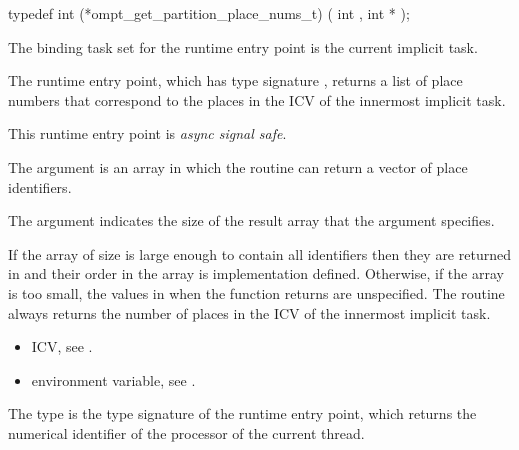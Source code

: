 \format
\begin{ccppspecific}
\begin{omptInquiry}
typedef int (*ompt_get_partition_place_nums_t) (
  int ,
  int *
);
\end{omptInquiry}
\end{ccppspecific}

\binding
The binding task set for the  runtime 
entry point is the current implicit task.

\descr
The  runtime entry point, which has
type signature , returns a list of 
place numbers that correspond to the places in the 
ICV of the innermost implicit task.

This runtime entry point is \emph{async signal safe}.

\argdesc
The  argument is an array in which the routine can 
return a vector of place identifiers.

The  argument indicates the size of the result
array that the  argument specifies.

\effect
If the  array of size  is large 
enough to contain all identifiers then they are returned in  
and their order in the array is implementation defined. Otherwise, if the 
 array is too small, the values in  when 
the function returns are unspecified. The routine always returns the number 
of places in the  ICV of the innermost implicit task.

\crossreferences
\begin{itemize}
\item {} ICV, see
.

\item {} environment variable, see
.
\end{itemize}



\label{sec:ompt_get_proc_id_t}
\label{sec:ompt_get_proc_id}

\summary
The  type is the type signature of the 
 runtime entry point, which returns the
numerical identifier of the processor of the current thread.

